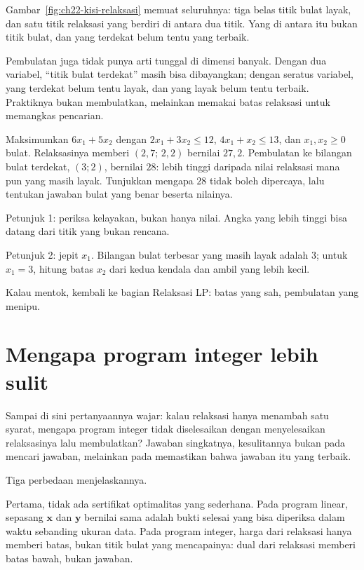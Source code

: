 Gambar~\ref{fig:ch22-kisi-relaksasi} memuat seluruhnya: tiga belas titik bulat layak, dan
satu titik relaksasi yang berdiri di antara dua titik. Yang di antara itu bukan titik bulat,
dan yang terdekat belum tentu yang terbaik.

Pembulatan juga tidak punya arti tunggal di dimensi banyak. Dengan dua variabel,
``titik bulat terdekat'' masih bisa dibayangkan; dengan seratus variabel, yang terdekat belum
tentu layak, dan yang layak belum tentu terbaik. Praktiknya bukan membulatkan, melainkan
memakai batas relaksasi untuk memangkas pencarian.

\begin{tantangan}
Maksimumkan $6x_{1}+5x_{2}$ dengan $2x_{1}+3x_{2}\le12$, $4x_{1}+x_{2}\le13$, dan
$x_{1},x_{2}\ge0$ bulat. Relaksasinya memberi $(2{,}7;\,2{,}2)$ bernilai $27{,}2$.
Pembulatan ke bilangan bulat terdekat, $(3;2)$, bernilai $28$: lebih tinggi daripada nilai
relaksasi mana pun yang masih layak. Tunjukkan mengapa $28$ tidak boleh dipercaya, lalu
tentukan jawaban bulat yang benar beserta nilainya.

Petunjuk 1: periksa kelayakan, bukan hanya nilai. Angka yang lebih tinggi bisa datang dari
titik yang bukan rencana.

Petunjuk 2: jepit $x_{1}$. Bilangan bulat terbesar yang masih layak adalah $3$; untuk
$x_{1}=3$, hitung batas $x_{2}$ dari kedua kendala dan ambil yang lebih kecil.

Kalau mentok, kembali ke bagian Relaksasi LP: batas yang sah, pembulatan yang menipu.
\end{tantangan}

\section{Mengapa program integer lebih sulit}

Sampai di sini pertanyaannya wajar: kalau relaksasi hanya menambah satu syarat, mengapa
program integer tidak diselesaikan dengan menyelesaikan relaksasinya lalu membulatkan?
Jawaban singkatnya, kesulitannya bukan pada mencari jawaban, melainkan pada memastikan
bahwa jawaban itu yang terbaik.

Tiga perbedaan menjelaskannya.

Pertama, tidak ada sertifikat optimalitas yang sederhana. Pada program linear,
sepasang $\mathbf{x}$ dan $\mathbf{y}$ bernilai sama adalah bukti selesai yang bisa diperiksa
dalam waktu sebanding ukuran data. Pada program integer, harga dari relaksasi hanya memberi
batas, bukan titik bulat yang mencapainya: dual dari relaksasi memberi batas bawah, bukan
jawaban.

